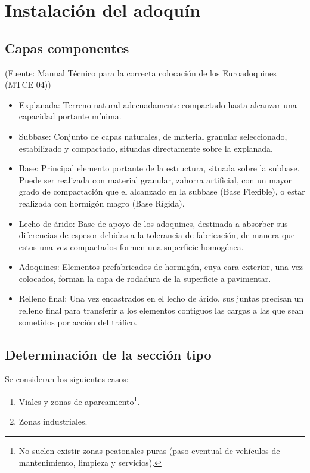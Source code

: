 \chapter{Instalación del adoquín}
\section{Capas componentes}

(Fuente: Manual Técnico para la correcta colocación de los Euroadoquines (MTCE 04))

\begin{itemize}
\item Explanada: Terreno natural adecuadamente compactado hasta alcanzar una capacidad portante mínima.
\item Subbase: Conjunto de capas naturales, de material granular seleccionado, estabilizado y compactado, situadas directamente sobre la explanada.
\item Base: Principal elemento portante de la estructura, situada sobre la subbase. Puede ser realizada con material granular, zahorra artificial, con un mayor grado de compactación que el alcanzado en la subbase (Base Flexible), o estar realizada con hormigón magro (Base Rígida).
\item Lecho de árido: Base de apoyo de los adoquines, destinada a absorber sus diferencias de espesor debidas a la tolerancia de fabricación, de manera que estos una vez compactados formen una superficie homogénea.
\item Adoquines: Elementos prefabricados de hormigón, cuya cara exterior, una vez colocados, forman la capa de rodadura de la superficie a pavimentar.
\item Relleno final: Una vez encastrados en el lecho de árido, sus juntas precisan un relleno final para transferir a los elementos contiguos las cargas a las que sean sometidos por acción del tráfico.
\end{itemize}

\section{Determinación de la sección tipo}\label{sec:secciontipo}

Se consideran los siguientes casos:

\begin{enumerate}
\item Viales y zonas de aparcamiento\footnote{No suelen existir zonas peatonales puras (paso eventual de vehículos de mantenimiento, limpieza y servicios).}.
\item Zonas industriales.
\end{enumerate}


